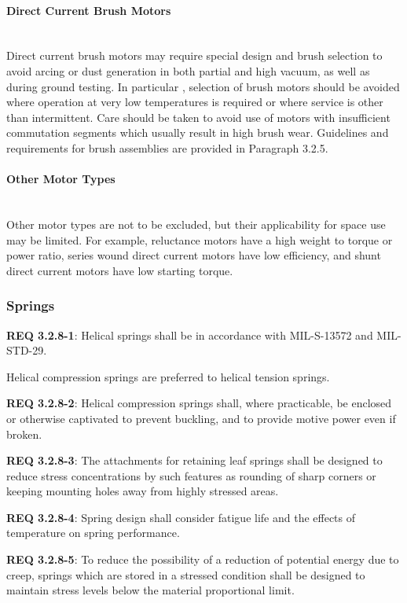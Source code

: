 \documentclass[12pt]{article}
\begin{document}
\paragraph{Direct Current Brush Motors} \mbox{} \\ %
Direct current brush motors may require special design and brush selection to avoid arcing or dust generation in both partial and high vacuum, as well as during ground testing. 
In particular , selection of brush motors should be avoided where operation at very low temperatures is required or where service is other than intermittent. 
Care should be taken to avoid use of motors with insufficient commutation segments which usually result in high brush wear. 
Guidelines and requirements for brush assemblies are provided in Paragraph 3.2.5.


\paragraph{Other Motor Types} \mbox{} \\ %
Other motor types are not to be excluded, but their applicability for space use may be limited. 
For example, reluctance motors have a high weight to torque or power ratio, series wound direct current motors have low efficiency, and shunt direct current motors have low starting torque.


\clearpage
\subsubsection{Springs} %
\noindent \textbf{REQ 3.2.8-1}: Helical springs shall be in accordance with MIL-S-13572 and MIL-STD-29. 

Helical compression springs are preferred to helical tension springs.

\noindent \textbf{REQ 3.2.8-2}: Helical compression springs shall, where practicable, be enclosed or otherwise captivated to prevent buckling, and to provide motive power even if broken.

\noindent \textbf{REQ 3.2.8-3}: The attachments for retaining leaf springs shall be designed to reduce stress concentrations by such features as rounding of sharp corners or keeping mounting holes away from highly stressed areas. 

\noindent \textbf{REQ 3.2.8-4}: Spring design shall consider fatigue life and the effects of temperature on spring performance. 

\noindent \textbf{REQ 3.2.8-5}: To reduce the possibility of a reduction of potential energy due to creep, springs which are stored in a stressed condition shall be designed to maintain stress levels below the material proportional limit. 
\end{document}
